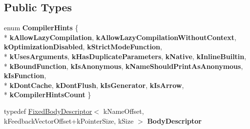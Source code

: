 \subsection*{Public Types}
\begin{DoxyCompactItemize}
\item 
\hypertarget{classv8_1_1internal_1_1_shared_function_info_a48ecd0019baf04d0631d1a555683e585}{}enum {\bfseries Compiler\+Hints} \{ \\*
{\bfseries k\+Allow\+Lazy\+Compilation}, 
{\bfseries k\+Allow\+Lazy\+Compilation\+Without\+Context}, 
{\bfseries k\+Optimization\+Disabled}, 
{\bfseries k\+Strict\+Mode\+Function}, 
\\*
{\bfseries k\+Uses\+Arguments}, 
{\bfseries k\+Has\+Duplicate\+Parameters}, 
{\bfseries k\+Native}, 
{\bfseries k\+Inline\+Builtin}, 
\\*
{\bfseries k\+Bound\+Function}, 
{\bfseries k\+Is\+Anonymous}, 
{\bfseries k\+Name\+Should\+Print\+As\+Anonymous}, 
{\bfseries k\+Is\+Function}, 
\\*
{\bfseries k\+Dont\+Cache}, 
{\bfseries k\+Dont\+Flush}, 
{\bfseries k\+Is\+Generator}, 
{\bfseries k\+Is\+Arrow}, 
\\*
{\bfseries k\+Compiler\+Hints\+Count}
 \}\label{classv8_1_1internal_1_1_shared_function_info_a48ecd0019baf04d0631d1a555683e585}

\item 
\hypertarget{classv8_1_1internal_1_1_shared_function_info_a0096c34f98f39aecfc7baf30d6495db0}{}typedef \hyperlink{classv8_1_1internal_1_1_fixed_body_descriptor}{Fixed\+Body\+Descriptor}$<$ k\+Name\+Offset, k\+Feedback\+Vector\+Offset+k\+Pointer\+Size, k\+Size $>$ {\bfseries Body\+Descriptor}\label{classv8_1_1internal_1_1_shared_function_info_a0096c34f98f39aecfc7baf30d6495db0}

\end{DoxyCompactItemize}
